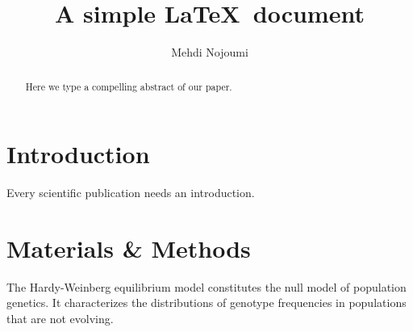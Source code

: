 \documentclass[12pt]{article}
\title{A simple \LaTeX\ document}
\author{Mehdi Nojoumi}
\date{}
\begin{document}
\maketitle
\begin{abstract}
Here we type a compelling abstract of our paper.
\end{abstract}
\section{Introduction}
Every scientific publication needs an introduction.
\section{Materials \& Methods}
The Hardy-Weinberg equilibrium model constitutes the null model of population genetics. It characterizes the distributions of genotype  frequencies in populations that are not evolving.
\end{document}
